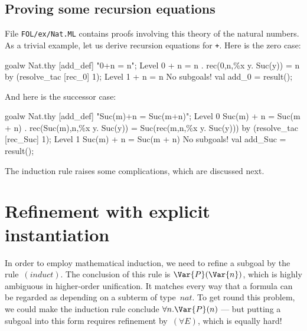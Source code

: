 \subsection{Proving some recursion equations}
File {\tt FOL/ex/Nat.ML} contains proofs involving this theory of the
natural numbers.  As a trivial example, let us derive recursion equations
for \verb$+$.  Here is the zero case:
\begin{ttbox}
goalw Nat.thy [add_def] "0+n = n";
{\out Level 0}
{ + n = n}
{. rec(0,n,\%x y. Suc(y)) = n}
\ttbreak
by (resolve_tac [rec_0] 1);
{\out Level 1}
{ + n = n}
{\out No subgoals!}
val add_0 = result();
\end{ttbox}
And here is the successor case:
\begin{ttbox}
goalw Nat.thy [add_def] "Suc(m)+n = Suc(m+n)";
{\out Level 0}
{\out Suc(m) + n = Suc(m + n)}
{. rec(Suc(m),n,\%x y. Suc(y)) = Suc(rec(m,n,\%x y. Suc(y)))}
\ttbreak
by (resolve_tac [rec_Suc] 1);
{\out Level 1}
{\out Suc(m) + n = Suc(m + n)}
{\out No subgoals!}
val add_Suc = result();
\end{ttbox}
The induction rule raises some complications, which are discussed next.


\section{Refinement with explicit instantiation}

In order to employ mathematical induction, we need to refine a subgoal by
the rule~$(induct)$.  The conclusion of this rule is $\Var{P}(\Var{n})$,
which is highly ambiguous in higher-order unification.  It matches every
way that a formula can be regarded as depending on a subterm of type~$nat$.
To get round this problem, we could make the induction rule conclude
$\forall n.\Var{P}(n)$ --- but putting a subgoal into this form requires
refinement by~$(\forall E)$, which is equally hard!

